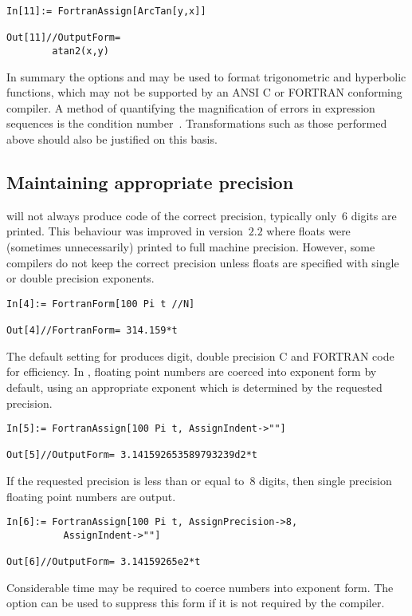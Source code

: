 \documentclass [12pt,twoside]{article}
\begin{document}
\begin{verbatim}
In[11]:= FortranAssign[ArcTan[y,x]]

Out[11]//OutputForm=
        atan2(x,y)
\end{verbatim}
In summary the options  and  may be
used to format trigonometric and hyperbolic functions, which may not be
supported by an ANSI C or FORTRAN conforming compiler.
A method of quantifying the magnification of errors in expression
sequences is the condition number~\cite{skeelbook}. Transformations such
as those performed above should also be justified on this basis.

\pagebreak[2]

\subsection{Maintaining appropriate precision}

 will not always produce code of the correct precision,
typically only~$6$ digits are printed. This behaviour was improved
in version~$2.2$ where floats were (sometimes unnecessarily) printed to
full machine precision. However, some compilers do not keep the correct
precision unless floats are specified with single or double precision
exponents.

\begin{verbatim}
In[4]:= FortranForm[100 Pi t //N]

Out[4]//FortranForm= 314.159*t
\end{verbatim}
The default setting for  produces 
digit, double precision C and FORTRAN code for efficiency. In
, floating point numbers are coerced into exponent form by
default, using an appropriate exponent which is determined by the requested
precision.
\begin{verbatim}
In[5]:= FortranAssign[100 Pi t, AssignIndent->""]

Out[5]//OutputForm= 3.141592653589793239d2*t
\end{verbatim}
If the requested precision is less than or equal to~$8$ digits, then single
precision floating point numbers are output.
\begin{verbatim}
In[6]:= FortranAssign[100 Pi t, AssignPrecision->8,
          AssignIndent->""]

Out[6]//OutputForm= 3.14159265e2*t
\end{verbatim}
Considerable time may be required to coerce numbers into exponent form.
The option  can be used to suppress this form
if it is not required by the compiler.
\end{document}
